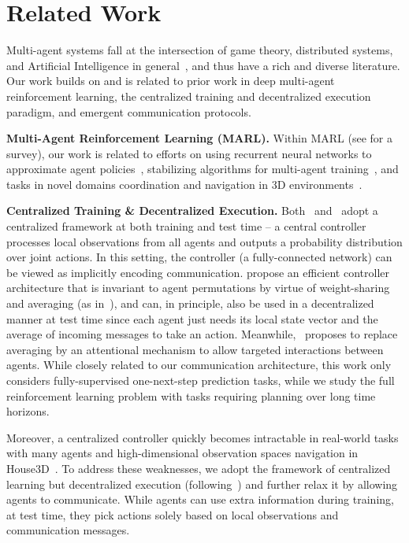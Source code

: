 \section{Related Work}
\label{sec:related}

Multi-agent systems fall at the intersection of game theory, distributed systems, and Artificial Intelligence in general~\citep{shoham_08}, and thus have a rich and diverse literature. Our work builds on and is related to prior work in deep multi-agent reinforcement learning, the centralized training and decentralized execution paradigm, and emergent communication protocols.

\textbf{Multi-Agent Reinforcement Learning (MARL).} Within MARL (see \citet{busoniu_08} for a survey), our work
is related to efforts on using recurrent neural networks to approximate agent policies~\citep{hausknecht_aaai15},
stabilizing algorithms for multi-agent training~\citep{lowe_nips17, foerster_aaai18},
and tasks in novel domains \eg coordination and navigation in 3D environments~\citep{peng_arxiv17,openai_18,jaderberg_arxiv18}.

\textbf{Centralized Training \& Decentralized Execution.} Both~\citet{sukhbaatar_nips16} and~\citet{hoshen_nips17}
adopt a centralized framework at both training and test time -- a central controller processes
local observations from all agents and outputs a probability distribution over joint actions.
In this setting, the controller (\eg a fully-connected network) can be viewed as implicitly
encoding communication. \citet{sukhbaatar_nips16} propose an efficient controller architecture
that is invariant to agent permutations by virtue of weight-sharing and averaging (as in~\citet{zaheer_nips17}),
and can, in principle, also be used in a decentralized manner at test time since each
agent just needs its local state vector and the average of incoming messages to take an action.
Meanwhile,~\citet{hoshen_nips17}
proposes to replace averaging by an attentional mechanism to allow targeted interactions between agents.
While closely related to our communication architecture, this work only considers fully-supervised
one-next-step prediction tasks, while we study the full reinforcement learning problem
with tasks requiring planning over long time horizons.

Moreover, a centralized controller quickly becomes intractable in real-world tasks with many agents and high-dimensional observation spaces \eg navigation in House3D~\citep{house3d}.
To address these weaknesses, we adopt the framework of centralized learning but decentralized execution
(following~\citet{foerster_nips16,lowe_nips17}) and further relax it by allowing agents to communicate.
While agents can use extra information during training, at test time, they pick actions solely based on
local observations and communication messages.


